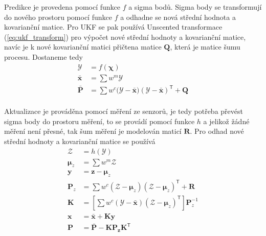 \documentclass[a4paper,12pt]{article}
\begin{document}
Predikce je provedena pomocí funkce $f$ a sigma bodů. Sigma body se transformují do nového prostoru pomocí funkce $f$ a odhadne se nová střední hodnota a kovarianční matice.
Pro UKF se pak používá Unscented transformace (\ref{eq:ukf_transform}) pro výpočet nové střední hodnoty a kovarianční matice, 
navíc je k nové kovarianční matici přičtena matice $\mathbf Q$, která je matice šumu procesu. Dostaneme tedy
\begin{equation}
    \begin{aligned}
        \boldsymbol{\mathcal Y} &= f(\boldsymbol\chi) \\
        \mathbf{\bar x} &= \sum w^m\boldsymbol{\mathcal Y}  \\
        \mathbf{\bar P} &= \sum w^c({\boldsymbol{\mathcal Y} - \mathbf{\bar x})(\boldsymbol{\mathcal Y} - \mathbf{\bar x})^\mathsf T}+\mathbf Q \\
    \end{aligned}
    \label{eq:ukf_predict}
\end{equation}

Aktualizace je prováděna pomocí měření ze senzorů, je tedy potřeba převést sigma body do prostoru měření, 
to se provádí pomocí funkce $h$ a jelikož žádné měření není přesné, tak šum měření je modelován maticí $\mathbf R$.
Pro odhad nové střední hodnoty a kovarianční matice se používá 
\begin{equation}
    \begin{aligned}
        \boldsymbol{\mathcal Z} &=  h(\boldsymbol{\mathcal{Y}}) \\
        \boldsymbol\mu_z &= \sum w^m\boldsymbol{\mathcal{Z}} \\
        \mathbf y &= \mathbf z - \boldsymbol\mu_z \\
        \mathbf P_z &= \sum w^c{(\boldsymbol{\mathcal Z}-\boldsymbol\mu_z)(\boldsymbol{\mathcal{Z}}-\boldsymbol\mu_z)^\mathsf{T}} + \mathbf R \\ 
        \mathbf K &= \left[\sum w^c(\boldsymbol{\mathcal Y}-\bar{\mathbf x})(\boldsymbol{\mathcal{Z}}-\boldsymbol\mu_z)^\mathsf{T}\right] \mathbf P_z^{-1} \\
        \mathbf x &= \mathbf{\bar x} + \mathbf{Ky}\\
        \mathbf P &= \bar{\mathbf P} - \mathbf{KP_z}\mathbf{K}^\mathsf{T}
    \end{aligned}
\end{equation}
\end{document}
